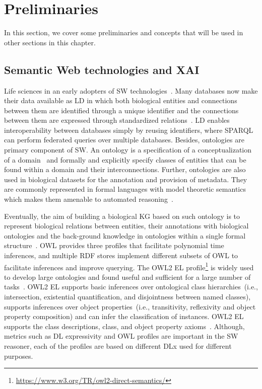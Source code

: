 \section{Preliminaries}\label{chapter_8:preliminaries}
In this section, we cover some preliminaries and concepts that will be used in other sections in this chapter. 

\subsection{Semantic Web technologies and XAI}
Life sciences in an early adopters of SW technologies~\cite{karim2018improving}. Many databases now make their data available as LD in which both biological entities and connections between them are identified through a unique identifier and the connections between them are expressed through standardized relations~\cite{alshahrani2017neuro}. LD enables interoperability between databases simply by reusing identifiers, where SPARQL can perform federated queries over multiple databases. Besides, ontologies are primary component of SW. An ontology is a specification of a conceptualization of a domain~\cite{alshahrani2017neuro} and formally and explicitly specify classes of entities that can be found within a domain and their interconnections. Further, ontologies are also used in biological datasets for the annotation and provision of metadata. They are commonly represented in formal languages with model theoretic semantics which makes them amenable to automated reasoning~\cite{alshahrani2017neuro}. 

\hspace*{3.5mm} Eventually, the aim of building a biological KG based on such ontology is to represent biological relations between entities, their annotations with biological ontologies and the back-ground knowledge in ontologies within a single formal structure~\cite{alshahrani2017neuro}. OWL provides three profiles that facilitate polynomial time inferences, and multiple RDF stores implement different subsets of OWL to facilitate inferences and improve querying. The OWL2 EL profile\footnote{\url{https://www.w3.org/TR/owl2-direct-semantics/}} is widely used to develop  large ontologies and found useful and sufficient for a large number of tasks~\cite{alshahrani2017neuro}. OWL2 EL supports basic inferences over ontological class hierarchies~(i.e., intersection, existential quantification, and disjointness between named classes), supports inferences over object properties~(i.e., transitivity, reflexivity and object property composition) and can infer the classification of instances. OWL2 EL supports the class descriptions, class, and object property axioms~\cite{alshahrani2017neuro}. Although, metrics such as DL expressivity and OWL profiles are important in the SW reasoner, each of the profiles are based on different DLx used for different purposes. 


